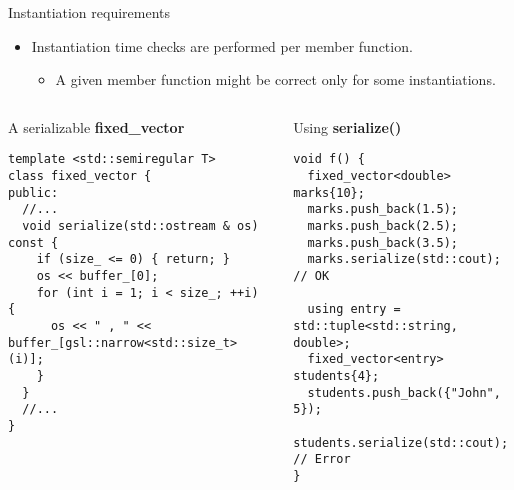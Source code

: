 \begin{frame}[t,fragile]{Instantiation requirements}
\begin{itemize}
  \item Instantiation time checks are performed per member function.
    \begin{itemize}
      \item A given member function might be correct only for some instantiations.
    \end{itemize}
\end{itemize}

\begin{columns}[T]


\begin{block}{A serializable \textbf{fixed\_vector}}
\begin{lstlisting}
template <std::semiregular T>
class fixed_vector {
public:
  //...
  void serialize(std::ostream & os) const {
    if (size_ <= 0) { return; }
    os << buffer_[0];
    for (int i = 1; i < size_; ++i) {
      os << " , " << buffer_[gsl::narrow<std::size_t>(i)];
    }
  }
  //...
}
\end{lstlisting}
\end{block}

\pause
{}
\begin{block}{Using \textbf{serialize()}}
\begin{lstlisting}
void f() {
  fixed_vector<double> marks{10};
  marks.push_back(1.5);
  marks.push_back(2.5);
  marks.push_back(3.5);
  marks.serialize(std::cout); // OK

  using entry = std::tuple<std::string, double>;
  fixed_vector<entry> students{4};
  students.push_back({"John", 5});
  students.serialize(std::cout); // Error
}
\end{lstlisting}
\end{block}

\end{columns}

\end{frame}
